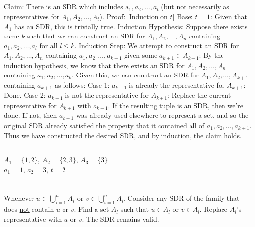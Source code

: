 \documentclass{article}
\begin{document}
\subsection{} %
Claim: There is an SDR which includes $a_1,a_2,\ldots,a_t$ (but not necessarily
as representatives for $A_1,A_2,\ldots,A_t$).
\newline
Proof: [Induction on $t$]
\newline
Base: $t=1$: Given that $A_1$ has an SDR, this is trivially true.
\newline
Induction Hypothesis: Suppose there exists some $k$ such that we can construct
an SDR for $A_1,A_2,\ldots,A_n$ containing $a_1,a_2,\ldots,a_l$ for all $l\le k$.
\newline
Induction Step: We attempt to construct an SDR for $A_1,A_2,\ldots,A_n$ containing
$a_1,a_2,\ldots,a_{k+1}$ given some $a_{k+1}\in A_{k+1}$:
\newline
By the induction hypothesis, we know that there exists an SDR for
$A_1,A_2,\ldots,A_n$ containing $a_1,a_2,\ldots,a_k$. Given this, we can construct
an SDR for $A_1,A_2,\ldots,A_{k+1}$ containing $a_{k+1}$ as follows:
\newline
Case 1: $a_{k+1}$ is already the representative for $A_{k+1}$: Done.
Case 2: $a_{k+1}$ is not the representative for $A_{k+1}$: Replace the current
representative for $A_{k+1}$ with $a_{k+1}$. If the resulting tuple is an SDR,
then we're done. If not, then $a_{k+1}$ was already used elsewhere to represent
a set, and so the original SDR already satisfied the property that it contained
all of $a_1,a_2,\ldots,a_{k+1}$.
\newline
Thus we have constructed the desired SDR, and by induction, the claim holds.
\subsection{} %
$A_1=\{1,2\}$, $A_2=\{2,3\}$, $A_3=\{3\}$\\
$a_1=1$, $a_2=3$, $t=2$
\section{} %
\subsection{} %
Whenever $u\in\bigcup_{i=1}^{n} A_i$ or $v\in\bigcup_{i=1}^{n} A_i$. Consider
any SDR of the family that does \underline{not} contain $u$ or $v$. Find a set
$A_l$ such that $u\in A_l$ or $v\in A_l$. Replace $A_l$'s representative with
$u$ or $v$. The SDR remains valid.
\end{document}
